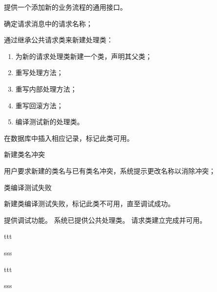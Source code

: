 \documentclass[cs4size,a4paper,nofonts]{ctexart}
\begin{document}
{提供一个添加新的业务流程的通用接口。} %
{} %
{
\item 确定请求消息中的请求名称；
\item 通过继承公共请求类来新建处理类：
\begin{enumerate}
\item 为新的请求处理类新建一个类，声明其父类；
\item 重写处理方法；
\item 重写内部处理方法；
\item 重写回滚方法；
\item 编译测试新的处理类。
\end{enumerate}
\item 在数据库中插入相应记录，标记此类可用。
} %
{} %
{
\item 新建类名冲突\par
用户要求新建的类名与已有类名冲突，系统提示更改名称以消除冲突；
\item 类编译测试失败\par
新建类编译测试失败，标记此类不可用，直至调试成功。
} %
{提供调试功能。} %
{系统已提供公共处理类。} %
{请求类建立完成并可用。} %

{} %
{} %
{
\item ttt
} %
{} %
{
\item sss
} %
{} %
{} %
{} %

{} %
{} %
{
\item ttt
} %
{} %
{
\item sss
} %
{} %
{} %
{} %

\end{document}

